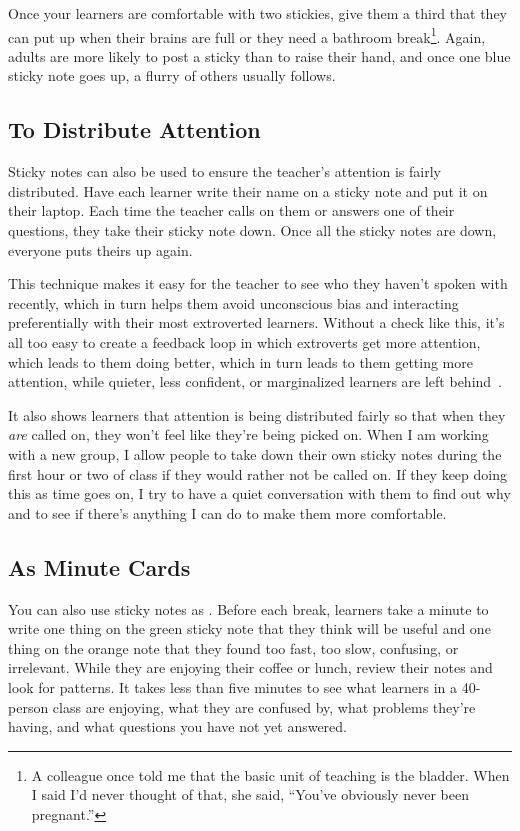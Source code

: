 Once your learners are comfortable with two stickies,
give them a third that they can put up when their brains are full
or they need a bathroom break\footnote{A colleague once told me that
the basic unit of teaching is the bladder.
When I said I'd never thought of that,
she said, ``You've obviously never been pregnant.''}.
Again,
adults are more likely to post a sticky than to raise their hand,
and once one blue sticky note goes up,
a flurry of others usually follows.

\subsection*{To Distribute Attention}

Sticky notes can also be used to ensure the teacher's attention is fairly distributed.
Have each learner write their name on a sticky note
and put it on their laptop.
Each time the teacher calls on them or answers one of their questions,
they take their sticky note down.
Once all the sticky notes are down,
everyone puts theirs up again.

This technique makes it easy for the teacher to see who they haven't spoken with recently,
which in turn helps them avoid unconscious bias
and interacting preferentially with their most extroverted learners.
Without a check like this,
it's all too easy to create a feedback loop in which extroverts get more attention,
which leads to them doing better,
which in turn leads to them getting more attention,
while quieter, less confident, or marginalized learners are left behind~\cite{Alvi1999,Juss2005}.

It also shows learners that attention is being distributed fairly
so that when they \emph{are} called on,
they won't feel like they're being picked on.
When I am working with a new group,
I allow people to take down their own sticky notes
during the first hour or two of class
if they would rather not be called on.
If they keep doing this as time goes on,
I try to have a quiet conversation with them to find out why
and to see if there's anything I can do to make them more comfortable.

\subsection*{As Minute Cards}

You can also use sticky notes as .
Before each break,
learners take a minute to write one thing on the green sticky note
that they think will be useful
and one thing on the orange note
that they found too fast,
too slow,
confusing,
or irrelevant.
While they are enjoying their coffee or lunch,
review their notes and look for patterns.
It takes less than five minutes to see what learners in a 40-person class are enjoying,
what they are confused by,
what problems they're having,
and what questions you have not yet answered.

